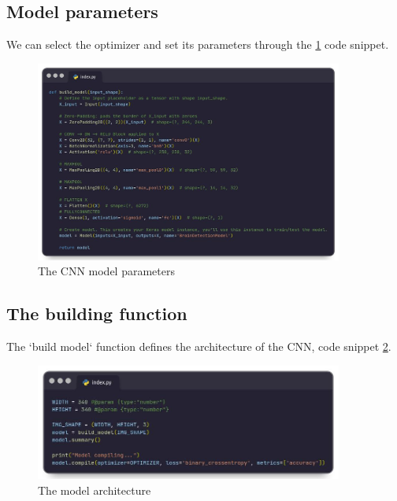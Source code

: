 \subsection{Model parameters}

We can select the optimizer and set its parameters through the \ref{fig:brain_tumor_model_params} code snippet.

\begin{figure}
    \centering
    \includegraphics[width=0.90\textwidth]{Img/Chap-01/21.jpg}
    \caption{ The CNN model parameters}
    \label{fig:brain_tumor_model_params}
\end{figure}

\subsection{The building function}

The `build model` function defines the architecture of the CNN, code snippet \ref{fig:brain_tumor_model_architecture}. 

\begin{figure}
    \centering
    \includegraphics[width=0.90\textwidth]{Img/Chap-01/22.jpg}
    \caption{ The model architecture}
    \label{fig:brain_tumor_model_architecture}
\end{figure}

